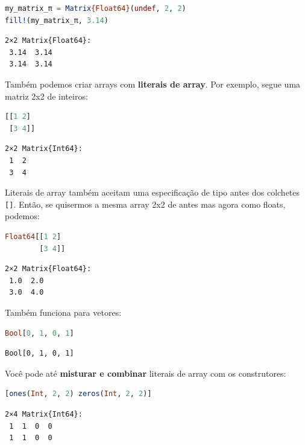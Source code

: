 \documentclass[
  notoc %
]{tufte-book}
\newcommand{\passthrough}[1]{#1}
\begin{document}
\begin{lstlisting}[language=Julia]
my_matrix_π = Matrix{Float64}(undef, 2, 2)
fill!(my_matrix_π, 3.14)
\end{lstlisting}

\begin{lstlisting}[language=Output]
2×2 Matrix{Float64}:
 3.14  3.14
 3.14  3.14
\end{lstlisting}

Também podemos criar arrays com \textbf{literais de array}. Por exemplo,
segue uma matriz 2x2 de inteiros:

\begin{lstlisting}[language=Julia]
[[1 2]
 [3 4]]
\end{lstlisting}

\begin{lstlisting}[language=Output]
2×2 Matrix{Int64}:
 1  2
 3  4
\end{lstlisting}

Literais de array também aceitam uma especificação de tipo antes dos
colchetes \passthrough{\lstinline![]!}. Então, se quisermos a mesma
array 2x2 de antes mas agora como floats, podemos:

\begin{lstlisting}[language=Julia]
Float64[[1 2]
        [3 4]]
\end{lstlisting}

\begin{lstlisting}[language=Output]
2×2 Matrix{Float64}:
 1.0  2.0
 3.0  4.0
\end{lstlisting}

Também funciona para vetores:

\begin{lstlisting}[language=Julia]
Bool[0, 1, 0, 1]
\end{lstlisting}

\begin{lstlisting}[language=Output]
Bool[0, 1, 0, 1]
\end{lstlisting}

Você pode até \textbf{misturar e combinar} literais de array com os
construtores:

\begin{lstlisting}[language=Julia]
[ones(Int, 2, 2) zeros(Int, 2, 2)]
\end{lstlisting}

\begin{lstlisting}[language=Output]
2×4 Matrix{Int64}:
 1  1  0  0
 1  1  0  0
\end{lstlisting}
\end{document}
